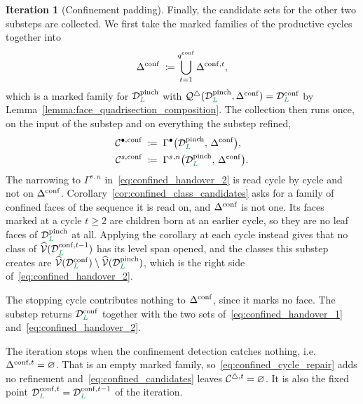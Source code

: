 \documentclass[a4paper, 12pt]{article}
\makeatletter
\newcommand{\quadriF}{\mathcal{Q}^{\triangle}}                   %
\newcommand{\collectV}{\Gamma^{\bullet}}                         %
\newcommand{\collectC}{\Gamma^{s}}                               %
\DeclareRobustCommand{\candV}[1][]{\mathcal{C}^{\bullet\ifx\@empty#1\@empty\else,#1\fi}}
\DeclareRobustCommand{\candF}[1][]{\mathcal{C}^{\triangle\ifx\@empty#1\@empty\else,#1\fi}}
\DeclareRobustCommand{\candC}[1][]{\mathcal{C}^{s\ifx\@empty#1\@empty\else,#1\fi}}
\newcommand{\green}{\color{ForestGreen}}
\newcommand{\V}{\mathcal{V}}
\DeclareRobustCommand{\simplexsubsetTwo}[2][]{\Delta\ifx\@empty#1\@empty\else^{#1}\fi_{#2}}
\newcommand{\vertexClasses}{\widehat{\V}}
\renewcommand{\L}{{\green L}}
\theoremstyle{definition}
\newtheorem{iteration}[theorem]{Iteration}
\theoremstyle{plain}
\numberwithin{equation}{section}
\DeclareRobustCommand{\domseq}[1][]{\mathcal{D}\ifx\@empty#1\@empty\else_{#1}\fi}
\makeatother
\begin{document}
\begin{iteration}[Confinement padding]
Finally, the candidate sets for the other two substeps are collected. We first take the marked families of the productive cycles together into
\begin{equation}
    \label{eq:confined_total_family}
    \simplexsubsetTwo[\mathrm{conf}]{} \; \coloneq \bigcup\limits_{t = 1}^{q^{\mathrm{conf}}} \simplexsubsetTwo[\mathrm{conf},t]{} ,
\end{equation}
which is a marked family for $\domseq[\L]^{\mathrm{pinch}}$ with $\quadriF ( \domseq[\L]^{\mathrm{pinch}}, \simplexsubsetTwo[\mathrm{conf}]{} ) = \domseq[\L]^{\mathrm{conf}}$ by Lemma~\ref{lemma:face_quadrisection_composition}. The collection then runs once, on the input of the substep and on everything the substep refined,
\begin{align}
    \label{eq:confined_handover_1}
    \candV[\mathrm{conf}] \; &\coloneq \; \collectV \big( \domseq[\L]^{\mathrm{pinch}}, \, \simplexsubsetTwo[\mathrm{conf}]{} \big), \\
    \label{eq:confined_handover_2}
    \candC[\mathrm{conf}] \; &\coloneq \; \collectC{}^{,n} \big( \domseq[\L]^{\mathrm{pinch}}, \, \simplexsubsetTwo[\mathrm{conf}]{} \big) .
\end{align}
The narrowing to $\collectC{}^{,n}$ in~\eqref{eq:confined_handover_2} is read cycle by cycle and not on $\simplexsubsetTwo[\mathrm{conf}]{}$. Corollary~\ref{cor:confined_class_candidates} asks for a family of confined faces of the sequence it is read on, and $\simplexsubsetTwo[\mathrm{conf}]{}$ is not one. Its faces marked at a cycle $t \geq 2$ are children born at an earlier cycle, so they are no leaf faces of $\domseq[\L]^{\mathrm{pinch}}$ at all. Applying the corollary at each cycle instead gives that no class of $\vertexClasses(\domseq[\L]^{\mathrm{conf},t-1})$ has its level span opened, and the classes this substep creates are $\vertexClasses(\domseq[\L]^{\mathrm{conf}}) \setminus \vertexClasses(\domseq[\L]^{\mathrm{pinch}})$, which is the right side of~\eqref{eq:confined_handover_2}.

The stopping cycle contributes nothing to $\simplexsubsetTwo[\mathrm{conf}]{}$, since it marks no face. The substep returns $\domseq[\L]^{\mathrm{conf}}$ together with the two sets of~\eqref{eq:confined_handover_1} and~\eqref{eq:confined_handover_2}.
\end{iteration}

The iteration stops when the confinement detection catches nothing, i.e. $\simplexsubsetTwo[\mathrm{conf},t]{} = \varnothing$. That is an empty marked family, so~\eqref{eq:confined_cycle_repair} adds no refinement and~\eqref{eq:confined_candidates} leaves $\candF[t] = \varnothing$. It is also the fixed point $\domseq[\L]^{\mathrm{conf},t} = \domseq[\L]^{\mathrm{conf},t-1}$ of the iteration.
\end{document}
